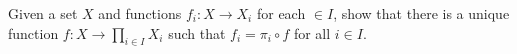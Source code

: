 
\begin{problem}[1.1.4]
  Given a set $X$ and functions $f_i : X \to X_i$ for each $ \in I$, show that there is a unique function $f : X \to \prod_{i\in I} X_i$ such that $f_i = \pi_i \circ f$ for all $i \in I$.
\end{problem}

\begin{solution}
\end{solution}

\begin{problem}[1.3.1]
\end{problem}

\begin{solution}
\end{solution}

\begin{problem}[1.5.5]
\end{problem}

\begin{solution}
\end{solution}

\begin{problem}[1.5.6]
\end{problem}

\begin{solution}
\end{solution}

\begin{problem}[1.6.5]
\end{problem}

\begin{solution}
\end{solution}

\begin{problem}[2.2.6]
\end{problem}

\begin{solution}
\end{solution}
